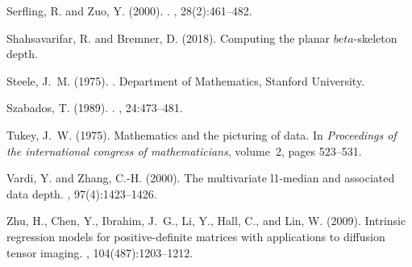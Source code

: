 \documentclass[a4paper]{article}
\numberwithin{equation}{section}
\begin{document}
\begin{thebibliography}{99}
  
Serfling, R. and Zuo, Y. (2000).
.
, 28(2):461--482.


Shahsavarifar, R. and Bremner, D. (2018).
\newblock Computing the planar $beta$-skeleton depth.


Steele, J.~M. (1975).
.
\newblock Department of Mathematics, Stanford University.

Szabados, T. (1989).
.
, 24:473--481.


  
Tukey, J.~W. (1975).
\newblock Mathematics and the picturing of data.
\newblock In {\em Proceedings of the international congress of mathematicians},
  volume~2, pages 523--531.

Vardi, Y. and Zhang, C.-H. (2000).
\newblock The multivariate l1-median and associated data depth.
,
  97(4):1423--1426.

Zhu, H., Chen, Y., Ibrahim, J.~G., Li, Y., Hall, C., and Lin, W. (2009).
\newblock Intrinsic regression models for positive-definite matrices with
  applications to diffusion tensor imaging.
,
  104(487):1203--1212.
\end{thebibliography}
\end{document}
